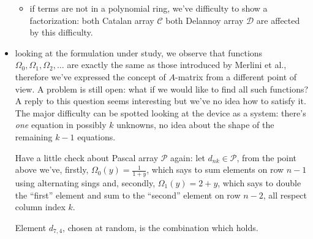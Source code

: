 \begin{itemize}
\begin{itemize}
        \item if terms are not in a polynomial ring, we've difficulty to show a
        factorization: 
        {both Catalan array $\mathcal{C}$ both Delannoy array
        $\mathcal{D}$ are} affected by this difficulty.

        \end{itemize}
        
    \item looking at the formulation under study, we observe that functions
        $\Omega_{0}, \Omega_{1}, \Omega_{2}, \ldots$ are exactly the same
        as those introduced by Merlini et al., therefore we've expressed
        the concept of $A$-matrix from a different point of view. A problem
        is still open: what if we would like to find all such functions? A reply
        to this question seems interesting but we've no idea how to satisfy it.
        The major difficulty can be spotted looking at the device as a system:
        there's \emph{one} equation in possibly $k$ unknowns, no
        idea about the shape of the remaining $k-1$ equations.

        Have a little check about Pascal array $\mathcal{P}$ again:
        let $d_{nk}\in\mathcal{P}$, from the point above we've, firstly,
        $\Omega_{0}(y)=\frac{1}{1+y}$, which says to sum elements
         on row $n-1$ using alternating sings
        { and, secondly, $\Omega_{1}(y)=2+y$, 
        which says to double the ``first'' element and sum to the ``second'' element
        on row $n-2$}, all respect column index $k$. 
        
        Element $d_{7,4}$, chosen at random, is the combination 
         which holds.

        



\end{itemize}


